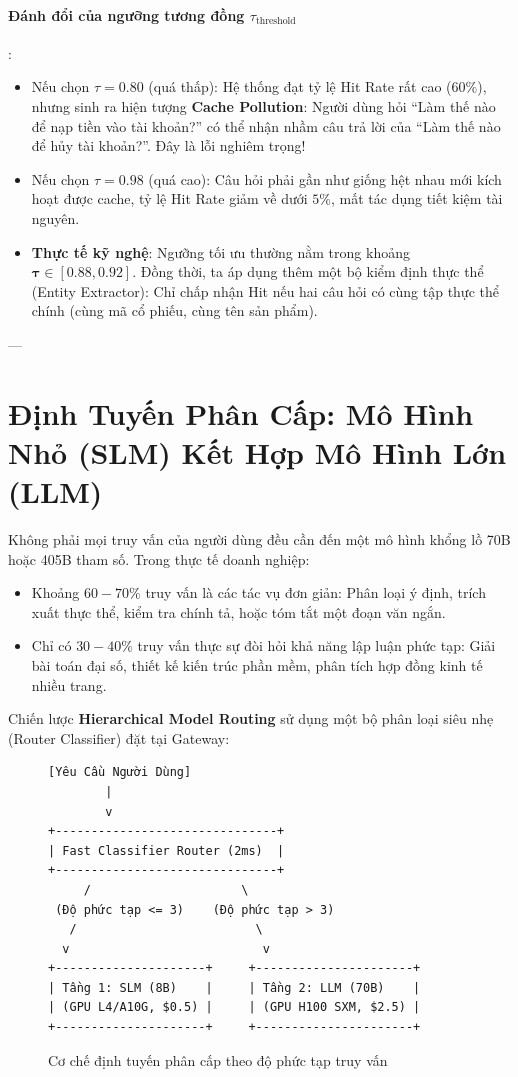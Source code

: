 \paragraph{Đánh đổi của ngưỡng tương đồng $\tau_{\text{threshold}}$}:
\begin{itemize}
  \item Nếu chọn $\tau = 0.80$ (quá thấp): Hệ thống đạt tỷ lệ Hit Rate rất cao ($60\%$), nhưng sinh ra hiện tượng \textbf{Cache Pollution}: Người dùng hỏi ``Làm thế nào để nạp tiền vào tài khoản?'' có thể nhận nhầm câu trả lời của ``Làm thế nào để hủy tài khoản?''. Đây là lỗi nghiêm trọng!
  \item Nếu chọn $\tau = 0.98$ (quá cao): Câu hỏi phải gần như giống hệt nhau mới kích hoạt được cache, tỷ lệ Hit Rate giảm về dưới $5\%$, mất tác dụng tiết kiệm tài nguyên.
  \item \textbf{Thực tế kỹ nghệ}: Ngưỡng tối ưu thường nằm trong khoảng $\mathbf{\tau \in [0.88, 0.92]}$. Đồng thời, ta áp dụng thêm một bộ kiểm định thực thể (Entity Extractor): Chỉ chấp nhận Hit nếu hai câu hỏi có cùng tập thực thể chính (cùng mã cổ phiếu, cùng tên sản phẩm).
\end{itemize}

---

\section{Định Tuyến Phân Cấp: Mô Hình Nhỏ (SLM) Kết Hợp Mô Hình Lớn (LLM)}
\label{sec:ch13-hierarchical-routing}

Không phải mọi truy vấn của người dùng đều cần đến một mô hình khổng lồ 70B hoặc 405B tham số.
Trong thực tế doanh nghiệp:
\begin{itemize}
  \item Khoảng $60 - 70\%$ truy vấn là các tác vụ đơn giản: Phân loại ý định, trích xuất thực thể, kiểm tra chính tả, hoặc tóm tắt một đoạn văn ngắn.
  \item Chỉ có $30 - 40\%$ truy vấn thực sự đòi hỏi khả năng lập luận phức tạp: Giải bài toán đại số, thiết kế kiến trúc phần mềm, phân tích hợp đồng kinh tế nhiều trang.
\end{itemize}

Chiến lược \textbf{Hierarchical Model Routing} sử dụng một bộ phân loại siêu nhẹ (Router Classifier) đặt tại Gateway:

\begin{figure}[htbp]
\centering
\small
\begin{verbatim}
[Yêu Cầu Người Dùng]
        |
        v
+-------------------------------+
| Fast Classifier Router (2ms)  |
+-------------------------------+
     /                     \
 (Độ phức tạp <= 3)    (Độ phức tạp > 3)
   /                         \
  v                           v
+---------------------+     +----------------------+
| Tầng 1: SLM (8B)    |     | Tầng 2: LLM (70B)    |
| (GPU L4/A10G, $0.5) |     | (GPU H100 SXM, $2.5) |
+---------------------+     +----------------------+
\end{verbatim}
\caption{Cơ chế định tuyến phân cấp theo độ phức tạp truy vấn}
\label{fig:model-routing}
\end{figure}

